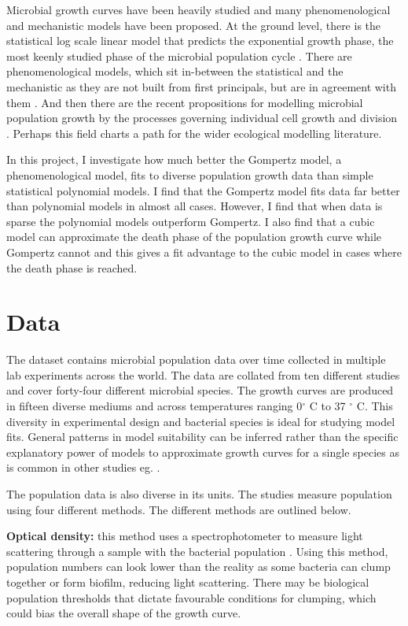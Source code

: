 \documentclass[11pt]{article}
\begin{document}
    Microbial growth curves have been heavily studied and many phenomenological and mechanistic models have been proposed. At the ground level, there is the statistical log scale linear model that predicts the exponential growth phase, the most keenly studied phase of the microbial population cycle \cite{Peleg2011}. There are phenomenological models, which sit in-between the statistical and the mechanistic as they are not built from first principals, but are in agreement with them \citep{Allen2018}. And then there are the recent propositions for modelling microbial population growth by the processes governing individual cell growth and division \citep{Jafarpour2019}. Perhaps this field charts a path for the wider ecological modelling literature.

    In this project, I investigate how much better the Gompertz model, a phenomenological model, fits to diverse population growth data than simple statistical polynomial models. I find that the Gompertz model fits data far better than polynomial models in almost all cases. However, I find that when data is sparse the polynomial models outperform Gompertz. I also find that a cubic model can approximate the death phase of the population growth curve while Gompertz cannot and this gives a fit advantage to the cubic model in cases where the death phase is reached.
  
  \section{Data}
  The dataset contains microbial population data over time collected in multiple lab experiments across the world.  The data are collated from ten different studies and cover forty-four different microbial species. The growth curves are produced in fifteen diverse mediums and across temperatures ranging 0$^{\circ}$ C to 37 $^{\circ}$ C. This diversity in experimental design and bacterial species is ideal for studying model fits. General patterns in model suitability can be inferred rather than the specific explanatory power of models to approximate growth curves for a single species as is common in other studies eg. \cite{Zwietering1990}.
  
  The population data is also diverse in its units. The studies measure population using four different methods. The different methods are outlined below. 

  \textbf{Optical density:} this method uses a spectrophotometer to measure light scattering through a sample with the bacterial population \cite{Madigan_Michael2021-07-01}. Using this method, population numbers can look lower than the reality as some bacteria can clump together or form biofilm, reducing light scattering. There may be biological population thresholds that dictate favourable conditions for clumping, which could bias the overall shape of the growth curve. 
\end{document}

